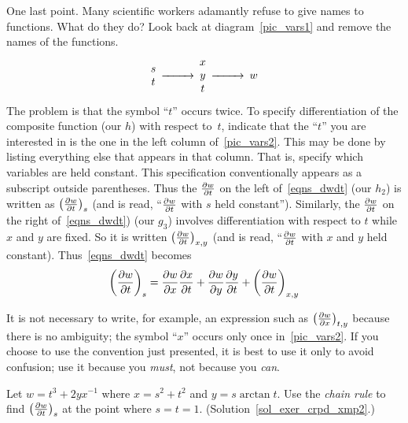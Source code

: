 One last point.  Many scientific workers adamantly refuse to give names to
functions.  What do they do?  Look back at diagram~\eqref{pic_vars1} and remove
the names of the functions.
 \begin{equation}\label{pic_vars2}
  \begin{CD}
   \begin{matrix} s \\ t \end{matrix}  @>>>
   \begin{matrix} x  \\ y \\ t \end{matrix} @>>> w
  \end{CD}
 \end{equation}
The problem is that the symbol ``$t$'' occurs twice.  To specify differentiation of the
composite function (our $h$) with respect to~$t$, indicate that the ``$t$'' you are interested
in is the one in the left column of~\eqref{pic_vars2}.  This may be done by listing everything
else that appears in that column. That is, specify which variables are held constant.  This
specification conventionally appears as a subscript outside parentheses.  Thus the $\frac{\partial w}{\partial t}$ on
the left of~\eqref{eqns_dwdt} (our $h_2$) is written as $\left(\frac{\partial w}{\partial t}\right)_{s}$ (and is read, ``$\frac{\partial w}{\partial t}$
with $s$ held constant'').  Similarly, the $\frac{\partial w}{\partial t}$ on the right of~\eqref{eqns_dwdt}) (our
$g_3$) involves differentiation with respect to $t$ while $x$ and $y$ are fixed.  So it is
written $\left(\frac{\partial w}{\partial t}\right)_{x,y}$ (and is read, ``$\frac{\partial w}{\partial t}$ with $x$ and $y$ held constant).
Thus~\eqref{eqns_dwdt} becomes
  \begin{equation}\label{eqn_dwdt3}
     \left(\frac{\partial w}{\partial t}\right)_{s} =  \frac{\partial w}{\partial x}\frac{\partial x}{\partial t} + \frac{\partial w}{\partial y}\frac{\partial y}{\partial t} + \left(\frac{\partial w}{\partial t}\right)_{x,y}
  \end{equation}

It is not necessary to write, for example, an expression such as $\left(\frac{\partial w}{\partial x}\right)_{t,y}$ because there
is no ambiguity; the symbol ``$x$'' occurs only once in~\eqref{pic_vars2}.  If you choose to
use the convention just presented, it is best to use it only to avoid confusion; use it
because you \emph{must}, not because you \emph{can}.

\begin{exer}\label{exer_crpd_xmp2}  Let $w = t^3 + 2yx^{-1}$ where $x = s^2 + t^2$ and $y =
s \arctan t$.  Use the \emph{chain rule} to find $\left(\frac{\partial w}{\partial t}\right)_{s}$ at the point where $s = t = 1$.
(Solution~\ref{sol_exer_crpd_xmp2}.)
\end{exer}

